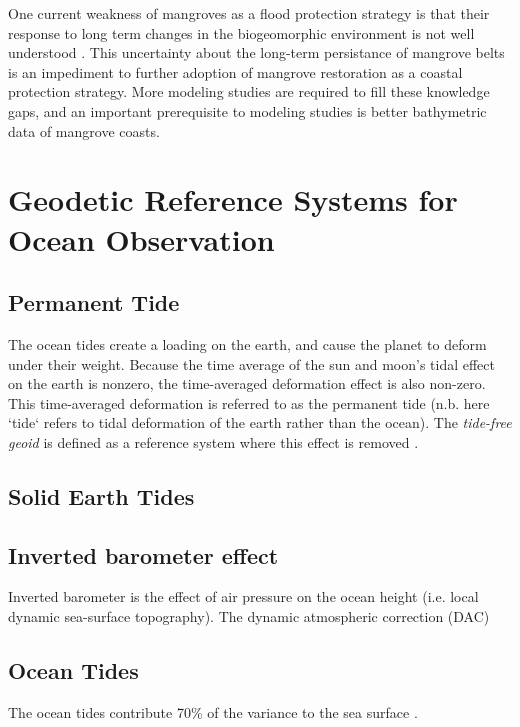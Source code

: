 One current weakness of mangroves as a flood protection strategy is that their response to long term changes in the biogeomorphic environment is not well understood \parencite{Gijsman2021}. This uncertainty about the long-term persistance of mangrove belts is an impediment to further adoption of mangrove restoration as a coastal protection strategy. More modeling studies are required to fill these knowledge gaps, and an important prerequisite to modeling studies is better bathymetric data of mangrove coasts.

\section{Geodetic Reference Systems for Ocean Observation}
\subsection{Permanent Tide}
The ocean tides create a loading on the earth, and cause the planet to deform under their weight. Because the time average of the sun and moon's tidal effect on the earth is nonzero, the time-averaged deformation effect is also non-zero. This time-averaged deformation is referred to as the permanent tide (n.b. here `tide` refers to tidal deformation of the earth rather than the ocean). The \emph{tide-free geoid} is defined as a reference system where this effect is removed \parencite{Makinen2009}.


\subsection{Solid Earth Tides}

\subsection{Inverted barometer effect}
Inverted barometer is the effect of air pressure on the ocean height (i.e. local dynamic sea-surface topography)\parencite{comparison guide}. The dynamic atmospheric correction (DAC) 
\subsection{Ocean Tides}

The ocean tides contribute 70\% of the variance to the sea surface \parencite{icesat2 comparison guide}.


